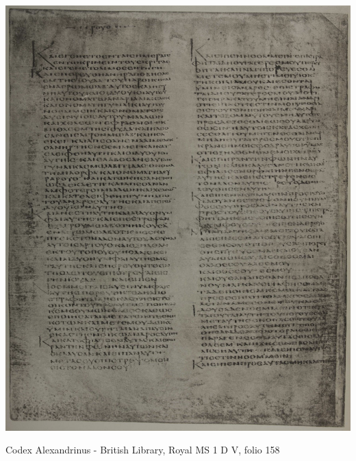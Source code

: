 \documentclass[11pt,a4paper]{article}
\begin{document}
     \includegraphics[width=\textwidth]{img/Codex_Alexandrinus_GA02_Ruth_folio_158.png}
     \caption{Codex Alexandrinus - British Library, Royal MS 1 D V, folio 158}
    \newpage
\end{document}
